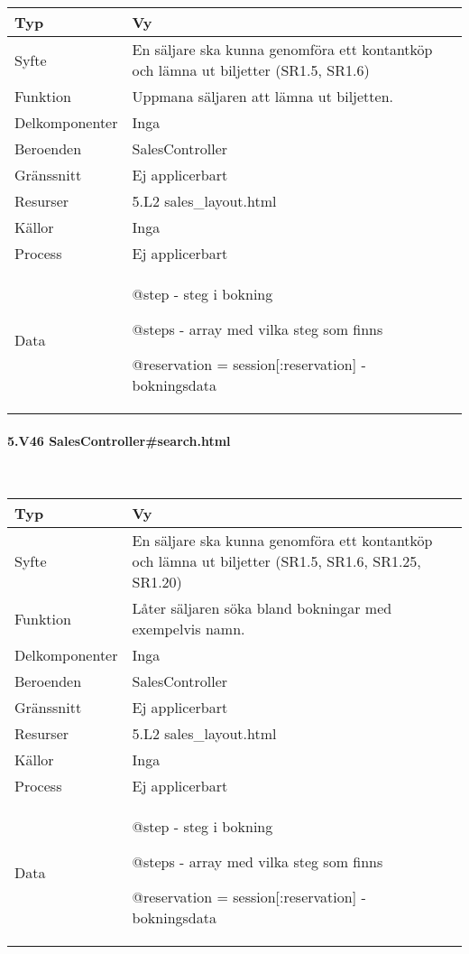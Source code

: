 \documentclass[a4paper, twoside, 11pt, titlepage]{article}
\begin{document}
			\begin {table} [ht] \begin{tabular} {  p{3.5cm} p{9.6cm} }
				\hline
				{Typ} & {Vy} \\
				\hline
				{Syfte} & {En säljare ska kunna genomföra ett kontantköp och lämna ut biljetter (SR1.5, SR1.6)} \\
				\hline
				{Funktion} & {Uppmana säljaren att lämna ut biljetten.} \\
				\hline
				{Delkomponenter} & {Inga} \\
				\hline
				{Beroenden} & {SalesController} \\
				\hline
				{Gränssnitt} & {Ej applicerbart} \\
				\hline
				{Resurser} & {5.L2 sales\_layout.html} \\
				\hline
				{Källor} & {Inga} \\
				\hline
				{Process} & {Ej applicerbart} \\
				\hline
				{Data} & {@step - steg i bokning

@steps - array med vilka steg som finns

@reservation = session[:reservation] - bokningsdata} \\
				\hline
			\end{tabular} \end{table} \FloatBarrier


			\paragraph{5.V46 SalesController\#search.html}\

			\begin {table} [ht] \begin{tabular} {  p{3.5cm} p{9.6cm} }
				\hline
				{Typ} & {Vy} \\
				\hline
				{Syfte} & {En säljare ska kunna genomföra ett kontantköp och lämna ut biljetter (SR1.5, SR1.6, SR1.25, SR1.20)} \\
				\hline
				{Funktion} & {Låter säljaren söka bland bokningar med exempelvis namn.} \\
				\hline
				{Delkomponenter} & {Inga} \\
				\hline
				{Beroenden} & {SalesController} \\
				\hline
				{Gränssnitt} & {Ej applicerbart} \\
				\hline
				{Resurser} & {5.L2 sales\_layout.html} \\
				\hline
				{Källor} & {Inga} \\
				\hline
				{Process} & {Ej applicerbart} \\
				\hline
				{Data} & {@step - steg i bokning

@steps - array med vilka steg som finns

@reservation = session[:reservation] - bokningsdata} \\
				\hline
			\end{tabular} \end{table} \FloatBarrier
\end{document}
